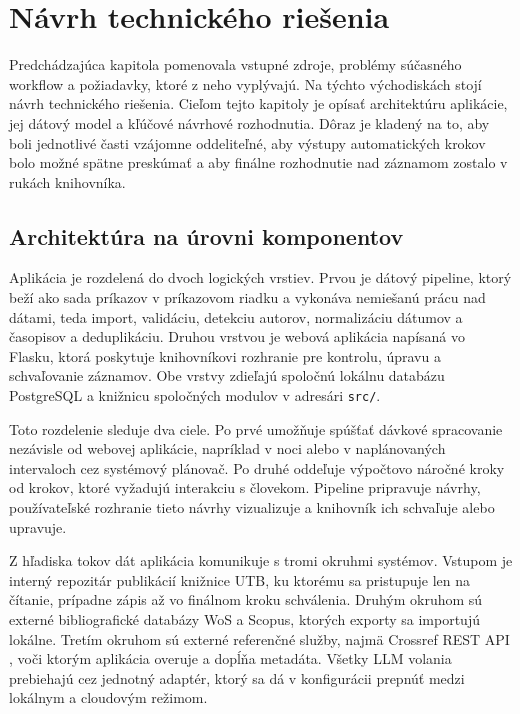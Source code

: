 
\section{Návrh technického riešenia}

Predchádzajúca kapitola pomenovala vstupné zdroje, problémy súčasného workflow a požiadavky, ktoré z neho vyplývajú. Na týchto východiskách stojí návrh technického riešenia. Cieľom tejto kapitoly je opísať architektúru aplikácie, jej dátový model a kľúčové návrhové rozhodnutia. Dôraz je kladený na to, aby boli jednotlivé časti vzájomne oddeliteľné, aby výstupy automatických krokov bolo možné spätne preskúmať a aby finálne rozhodnutie nad záznamom zostalo v rukách knihovníka.

\subsection{Architektúra na úrovni komponentov}

Aplikácia je rozdelená do dvoch logických vrstiev. Prvou je dátový pipeline, ktorý beží ako sada príkazov v príkazovom riadku a vykonáva nemiešanú prácu nad dátami, teda import, validáciu, detekciu autorov, normalizáciu dátumov a časopisov a deduplikáciu. Druhou vrstvou je webová aplikácia napísaná vo Flasku, ktorá poskytuje knihovníkovi rozhranie pre kontrolu, úpravu a schvaľovanie záznamov. Obe vrstvy zdieľajú spoločnú lokálnu databázu PostgreSQL a knižnicu spoločných modulov v adresári \texttt{src/}.

Toto rozdelenie sleduje dva ciele. Po prvé umožňuje spúšťať dávkové spracovanie nezávisle od webovej aplikácie, napríklad v noci alebo v naplánovaných intervaloch cez systémový plánovač. Po druhé oddeľuje výpočtovo náročné kroky od krokov, ktoré vyžadujú interakciu s človekom. Pipeline pripravuje návrhy, používateľské rozhranie tieto návrhy vizualizuje a knihovník ich schvaľuje alebo upravuje.

Z hľadiska tokov dát aplikácia komunikuje s tromi okruhmi systémov. Vstupom je interný repozitár publikácií knižnice UTB, ku ktorému sa pristupuje len na čítanie, prípadne zápis až vo finálnom kroku schválenia. Druhým okruhom sú externé bibliografické databázy WoS a Scopus, ktorých exporty sa importujú lokálne. Tretím okruhom sú externé referenčné služby, najmä Crossref REST API \cite{CrossrefRESTAPI}, voči ktorým aplikácia overuje a dopĺňa metadáta. Všetky LLM volania prebiehajú cez jednotný adaptér, ktorý sa dá v konfigurácii prepnúť medzi lokálnym a cloudovým režimom.


